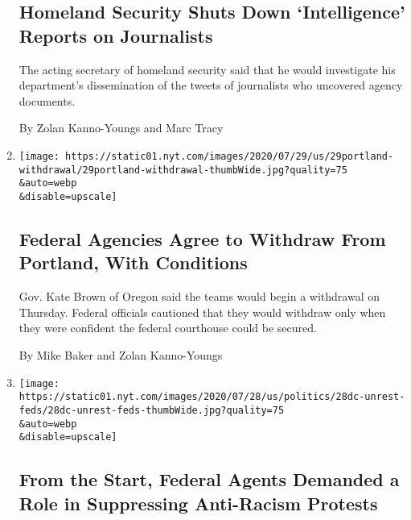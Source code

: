 \begin{enumerate}
  \hypertarget{homeland-security-shuts-down-intelligence-reports-on-journalists}{%
  \subsection{Homeland Security Shuts Down `Intelligence' Reports on
  Journalists}\label{homeland-security-shuts-down-intelligence-reports-on-journalists}}

  The acting secretary of homeland security said that he would
  investigate his department's dissemination of the tweets of
  journalists who uncovered agency documents.

  By Zolan Kanno-Youngs and Marc Tracy
\item
  \href{/2020/07/29/us/protests-portland-federal-withdrawal.html}{}

  \texttt{[image: https://static01.nyt.com/images/2020/07/29/us/29portland-withdrawal/29portland-withdrawal-thumbWide.jpg?quality=75\\\&auto=webp\\\&disable=upscale]}

  \hypertarget{federal-agencies-agree-to-withdraw-from-portland-with-conditions}{%
  \subsection{Federal Agencies Agree to Withdraw From Portland, With
  Conditions}\label{federal-agencies-agree-to-withdraw-from-portland-with-conditions}}

  Gov. Kate Brown of Oregon said the teams would begin a withdrawal on
  Thursday. Federal officials cautioned that they would withdraw only
  when they were confident the federal courthouse could be secured.

  By Mike Baker and Zolan Kanno-Youngs
\item
  \href{/2020/07/28/us/federal-agents-portland-seattle-protests.html}{}

  \texttt{[image: https://static01.nyt.com/images/2020/07/28/us/politics/28dc-unrest-feds/28dc-unrest-feds-thumbWide.jpg?quality=75\\\&auto=webp\\\&disable=upscale]}

  \hypertarget{from-the-start-federal-agents-demanded-a-role-in-suppressing-anti-racism-protests}{%
  \subsection{From the Start, Federal Agents Demanded a Role in
  Suppressing Anti-Racism
  Protests}\label{from-the-start-federal-agents-demanded-a-role-in-suppressing-anti-racism-protests}}


\end{enumerate}
